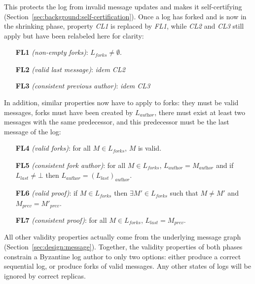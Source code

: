 \documentclass[9pt, oneside]{article}   	%
\newcommand{\logleadsto}{\overset{\textit{log}}\leadsto}
\begin{document}
This protects the log from invalid message updates and makes it self-certifying (Section~\ref{sec:background:self-certification}).  Once a log has forked and is now in the shrinking phase, property \textit{CL1} is replaced by \textit{FL1}, while \textit{CL2} and \textit{CL3} still apply but have been relabeled here for clarity:
\begin{tcolorbox}
\begin{enumerate}
	\item[\textbf{FL1}] \textit{(non-empty forks)}: $L_\textit{forks} \neq \emptyset$.
	\item[\textbf{FL2}] \textit{(valid last message)}: \textit{idem CL2}
	\item[\textbf{FL3}] \textit{(consistent previous author)}: \textit{idem CL3}
\end{enumerate}
\end{tcolorbox}


In addition, similar properties now have to apply to forks: they must be valid messages, forks must have been created by $L_\textit{author}$, there must exist at least two messages with the same predecessor, and this predecessor must be the last message of the log: 
\begin{tcolorbox}
\begin{enumerate}
	\item[\textbf{FL4}] \textit{(valid forks)}: for all $M \in L_\textit{forks}$, $M$ is valid.
	\item[\textbf{FL5}] \textit{(consistent fork author)}: for all $M \in L_\textit{forks}$, $L_\textit{author} = M_\textit{author}$ and if $L_\textit{last} \neq \bot$ then $L_\textit{author} = (L_\textit{last})_\textit{author}$.
	\item[\textbf{FL6}] \textit{(valid proof)}: if $M \in L_\textit{forks}$ then $\exists M' \in L_\textit{forks}$ such that $M \neq M'$ and $M_\textit{prev} = M'_\textit{prev}$.
	\item[\textbf{FL7}] \textit{(consistent proof)}:  for all $M \in L_\textit{forks}$, $L_\textit{last} = M_\textit{prev}$. %
\end{enumerate}
\end{tcolorbox}

All other validity properties actually come from the underlying message graph (Section~\ref{sec:design:message}). Together, the validity properties of both phases constrain a Byzantine log author to only two options: either produce a correct sequential log, or produce forks of valid messages. Any other states of logs will be ignored by correct replicas.
\end{document}
